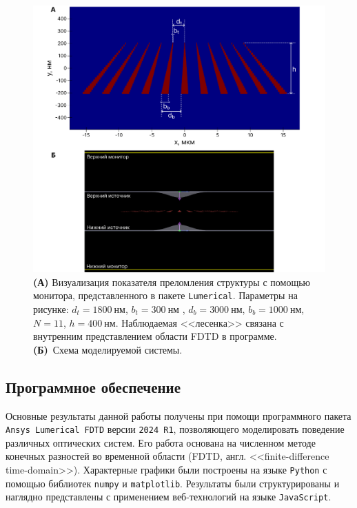 \begin{figure}
    \begin{center}
        \includegraphics[width=\textwidth]{pictures/Structure.png}
        \caption{\textbf{(А)} Визуализация показателя преломления структуры с помощью монитора, представленного в пакете \texttt{Lumerical}. Параметры на рисунке: $d_t = 1800\ \text{нм}$, \mbox{$b_t = 300\ \text{нм }$}, $d_b = 3000\ \text{нм}$, $b_b = 1000\ \text{нм}$, $N = 11$, $h = 400\ \text{нм}$. Наблюдаемая <<лесенка>> связана с внутренним представлением области FDTD в программе. \textbf{(Б)}~Схема моделируемой системы.}
        \label{fig:structure}
    \end{center}
\end{figure}

\subsection{Программное обеспечение}
Основные результаты данной работы получены при помощи программного пакета \texttt{Ansys Lumerical FDTD} версии \texttt{2024 R1}, позволяющего моделировать поведение различных оптических систем. Его работа основана на численном методе конечных разностей во временной области (FDTD, англ. <<finite-difference time-domain>>). Характерные графики были построены на языке \texttt{Python} с помощью библиотек \texttt{numpy} и \texttt{matplotlib}. Результаты были структурированы и наглядно представлены с применением веб-технологий на языке \texttt{JavaScript}.

